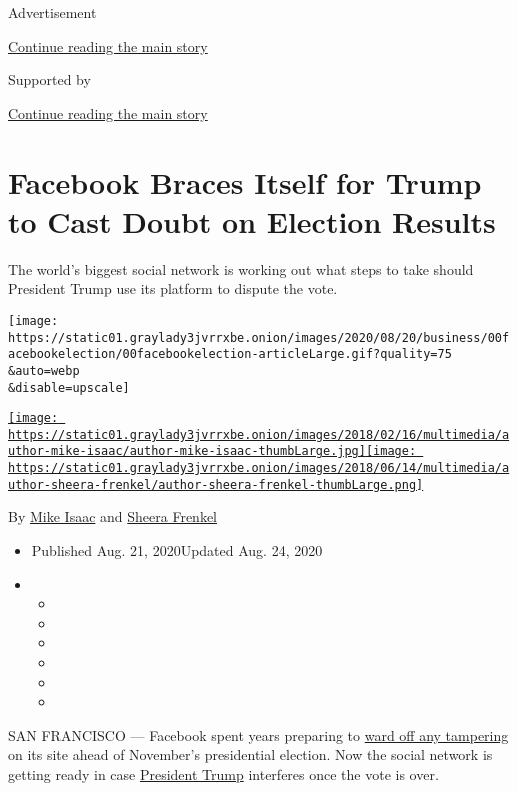 Advertisement

\protect\hyperlink{after-top}{Continue reading the main story}

Supported by

\protect\hyperlink{after-sponsor}{Continue reading the main story}

\hypertarget{facebook-braces-itself-for-trump-to-cast-doubt-on-election-results}{%
\section{Facebook Braces Itself for Trump to Cast Doubt on Election
Results}\label{facebook-braces-itself-for-trump-to-cast-doubt-on-election-results}}

The world's biggest social network is working out what steps to take
should President Trump use its platform to dispute the vote.

\texttt{[image: https://static01.graylady3jvrrxbe.onion/images/2020/08/20/business/00facebookelection/00facebookelection-articleLarge.gif?quality=75\\\&auto=webp\\\&disable=upscale]}

\href{https://www.nytimes3xbfgragh.onion/by/mike-isaac}{\texttt{[image: https://static01.graylady3jvrrxbe.onion/images/2018/02/16/multimedia/author-mike-isaac/author-mike-isaac-thumbLarge.jpg]}}\href{https://www.nytimes3xbfgragh.onion/by/sheera-frenkel}{\texttt{[image: https://static01.graylady3jvrrxbe.onion/images/2018/06/14/multimedia/author-sheera-frenkel/author-sheera-frenkel-thumbLarge.png]}}

By \href{https://www.nytimes3xbfgragh.onion/by/mike-isaac}{Mike Isaac}
and \href{https://www.nytimes3xbfgragh.onion/by/sheera-frenkel}{Sheera
Frenkel}

\begin{itemize}
\item
  Published Aug. 21, 2020Updated Aug. 24, 2020
\item
  \begin{itemize}
  \item
  \item
  \item
  \item
  \item
  \item
  \end{itemize}
\end{itemize}

SAN FRANCISCO --- Facebook spent years preparing to
\href{https://www.nytimes3xbfgragh.onion/2020/03/29/technology/facebook-google-twitter-november-election.html}{ward
off any tampering} on its site ahead of November's presidential
election. Now the social network is getting ready in case
\href{https://www.nytimes3xbfgragh.onion/2020/09/03/us/politics/trump-2020-election.html}{President
Trump} interferes once the vote is over.

